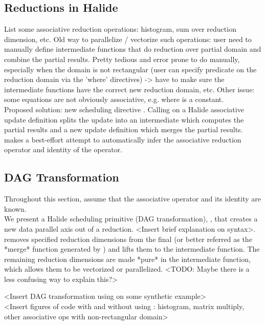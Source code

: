 \subsection{Reductions in Halide}

List some associative reduction operations: histogram, sum over reduction dimension, etc. Old way to parallelize / vectorize such operations: user need to manually define intermediate functions that do reduction over partial domain and combine the partial results. Pretty tedious and error prone to do manually, especially when the domain is not rectangular (user can specify predicate on the reduction domain via the 'where' directives) -> have to make sure the intermediate functions have the correct new reduction domain, etc. Other issue: some equations are not obviously associative, e.g.  where  is a constant. \\

Proposed solution: new scheduling directive . Calling  on a Halide associative update definition splits the update into an intermediate which computes the partial results and a new update definition which merges the partial results.  makes a best-effort attempt to automatically infer the associative reduction operator and identity of the operator.

\subsection{ DAG Transformation}

Throughout this section, assume that the associative operator and its identity are known. \\

We present a Halide scheduling primitive (DAG transformation), , that creates a new data parallel axis out of a reduction. <Insert brief explanation on  syntax>.  removes specified reduction dimensions from the final (or better referred as the *merge* function generated by ) and lifts them to the intermediate function. The remaining reduction dimensions are made *pure* in the intermediate function, which allows them to be vectorized or parallelized. <TODO: Maybe there is a less confusing way to explain this?>

<Insert DAG transformation using  on some synthetic example> \\

<Insert figures of code with and without using : histogram, matrix multiply, other associative ops with non-rectangular domain> \\

